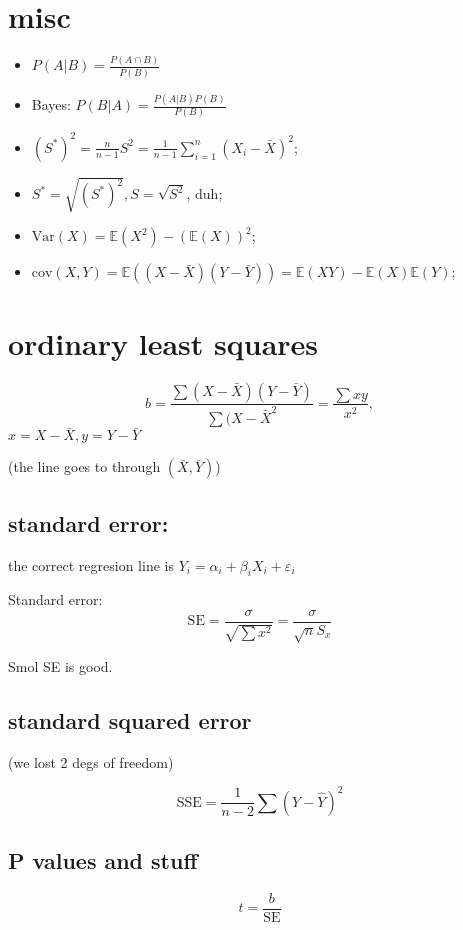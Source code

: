 \documentclass[11pt]{article}
\date{\today}
\title{}
\begin{document}
\section*{misc}
\label{sec:org88bbe4d}
\begin{itemize}
\item \(P(A|B) = \frac {P(A \cap B)}{P(B)}\)
\item Bayes: \(P(B|A) = \frac {P(A|B) P(B)}{P(B)}\)
\item \(\displaystyle (S^*)^2 = \frac{n}{n-1} S^2 = \frac{1}{n-1} \sum_{i=1}^{n} (X_i- \bar{X})^2\);
\item \(S^* = \sqrt{(S^*)^2}, S = \sqrt{S^2}\), duh;
\item \(\mathrm{Var}(X) = \mathbb{E}(X^2) - \left(\mathbb{E}(X)\right)^2\);

\item \(\mathrm{cov}(X, Y) = \mathbb{E}\left(( X - \bar{X}  ) (Y - \bar{Y}) \right) = \mathbb{E}(XY) - \mathbb{E}(X)\mathbb{E}(Y)\);
\end{itemize}
\section*{ordinary least squares}
\label{sec:org30e47f0}

\[ b  = \frac{\sum(X-\bar{X})(Y-\bar{Y})}{\sum(X-\bar{X}^2} = \frac{\sum xy}{x^2}, \]
\(x =X-\bar{X}, y =Y-\bar{Y}\)

(the line goes to through \((\bar{X}, \bar{Y})\))

\subsection*{standard error:}
\label{sec:orge41599d}
the correct regresion line is \(Y_i = \alpha_i+\beta_i X_i + \varepsilon_i\)

Standard error:
\[ \mathrm{SE} = \frac{\sigma }{\sqrt{\sum x^2}} = \frac{\sigma}{\sqrt{n} S_x} \]

Smol SE is good.

\subsection*{standard squared error}
\label{sec:org0beb46f}
(we lost 2 degs of freedom)

\[ \mathrm{SSE} = \frac{1}{n-2} \sum (Y-\hat{Y})^2 \]


\subsection*{P values and stuff}
\label{sec:orgd14eed7}
\[ t = \frac{b}{\mathrm{SE}} \]
\end{document}
